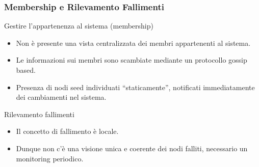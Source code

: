 \begin{frame}
  \frametitle{Membership e Rilevamento Fallimenti}
  \begin{block}{Gestire l'appartenenza al sistema (membership)}
  \begin{itemize}
  \item Non è presente una vista centralizzata dei membri appartenenti al sistema.
  \item Le informazioni sui membri sono scambiate mediante un protocollo \alert{gossip based}.
  \item Presenza di nodi \alert{seed} individuati ``staticamente'', notificati immediatamente dei cambiamenti nel sistema.
  \end{itemize}
  \end{block}
  \begin{block}{Rilevamento fallimenti}
  \begin{itemize}
  \item Il concetto di fallimento è locale.
  \item Dunque non c'è una visione unica e coerente dei nodi falliti, necessario un monitoring periodico.
  \end{itemize}
  \end{block}
\end{frame}



